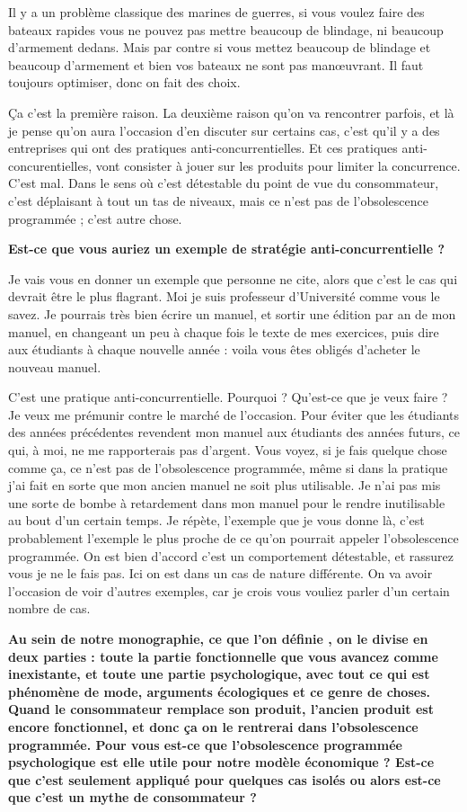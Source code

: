 \begin{small}
Il y a un problème classique des marines de guerres, si vous voulez faire des bateaux rapides vous ne pouvez pas mettre beaucoup de blindage, ni beaucoup d'armement dedans. Mais par contre si vous mettez beaucoup de blindage et beaucoup d'armement et bien vos bateaux ne sont pas manœuvrant. Il faut toujours optimiser, donc on fait des choix. 

Ça c'est la première raison. La deuxième raison qu'on va rencontrer parfois, et là je pense qu'on aura l'occasion d'en discuter sur certains cas, c'est qu'il y a  des entreprises qui ont des pratiques anti-concurrentielles. Et ces pratiques anti-concurentielles, vont consister à jouer sur les produits pour limiter la concurrence. C'est mal. Dans le sens où c'est détestable du point de vue du consommateur, c'est déplaisant à tout un tas de niveaux, mais ce n'est pas de l'obsolescence programmée ; c'est autre chose.

\smallbreak\textbf{Est-ce que vous auriez un exemple de stratégie anti-concurrentielle ?
}\smallbreak

 Je vais vous en donner un exemple que personne ne cite, alors que c'est le cas qui devrait être le plus flagrant. Moi je suis professeur d'Université comme vous le savez. Je pourrais très bien écrire un manuel, et sortir une édition par an de mon manuel, en changeant un peu à chaque fois le texte de mes exercices, puis dire aux étudiants à chaque nouvelle année  : voila vous êtes obligés d'acheter le nouveau manuel. 


C'est une pratique anti-concurrentielle. Pourquoi ? Qu'est-ce que je veux faire ?  Je veux me prémunir contre le marché de l'occasion. Pour éviter que les étudiants des années précédentes revendent mon manuel aux étudiants des années futurs, ce qui, à moi, ne me rapporterais pas d'argent. Vous voyez, si je fais quelque chose comme ça, ce n'est pas de l'obsolescence programmée, même si dans la pratique j'ai fait en sorte que mon ancien manuel ne soit plus utilisable. Je n'ai pas mis une sorte de bombe à retardement dans mon manuel pour le rendre inutilisable au bout d'un certain temps. Je répète, l'exemple que je vous donne là, c'est probablement l'exemple le plus proche de ce qu'on pourrait appeler l'obsolescence programmée. On est bien d'accord c'est un comportement détestable, et rassurez vous je ne le fais pas. Ici on est dans un cas de nature différente. On va avoir l'occasion de voir d'autres exemples, car je crois vous vouliez parler d'un certain nombre de cas.

\smallbreak\textbf{
Au sein de notre monographie, ce que l'on définie \textit{\OP}, on le divise en deux parties : toute la partie fonctionnelle que vous avancez comme inexistante, et toute une partie psychologique, avec tout ce qui est phénomène de mode, arguments écologiques et ce genre de choses. Quand le consommateur remplace son produit, l'ancien produit est encore fonctionnel, et donc ça on le rentrerai dans l'obsolescence programmée. Pour vous est-ce que l'obsolescence programmée psychologique est elle utile pour notre modèle économique ? Est-ce que c'est seulement appliqué pour quelques cas isolés ou alors est-ce que c'est un mythe de consommateur ?
}\smallbreak


\end{small}
